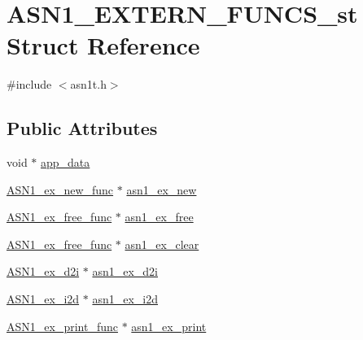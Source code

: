 \hypertarget{struct_a_s_n1___e_x_t_e_r_n___f_u_n_c_s__st}{}\section{A\+S\+N1\+\_\+\+E\+X\+T\+E\+R\+N\+\_\+\+F\+U\+N\+C\+S\+\_\+st Struct Reference}
\label{struct_a_s_n1___e_x_t_e_r_n___f_u_n_c_s__st}


{\ttfamily \#include $<$asn1t.\+h$>$}

\subsection*{Public Attributes}
\begin{DoxyCompactItemize}
\item 
void $\ast$ \hyperlink{struct_a_s_n1___e_x_t_e_r_n___f_u_n_c_s__st_aeab59571882fc1a035b3e68ea20eb8ab}{app\+\_\+data}
\item 
\hyperlink{asn1t_8h_a974a90edb24a690e5e664128a975412e}{A\+S\+N1\+\_\+ex\+\_\+new\+\_\+func} $\ast$ \hyperlink{struct_a_s_n1___e_x_t_e_r_n___f_u_n_c_s__st_aaba71f535decc929f44857651b39934c}{asn1\+\_\+ex\+\_\+new}
\item 
\hyperlink{asn1t_8h_a98b861bda8c86873a9d02978fcba10cf}{A\+S\+N1\+\_\+ex\+\_\+free\+\_\+func} $\ast$ \hyperlink{struct_a_s_n1___e_x_t_e_r_n___f_u_n_c_s__st_abdcdceb05e0645c60431380e0161eb51}{asn1\+\_\+ex\+\_\+free}
\item 
\hyperlink{asn1t_8h_a98b861bda8c86873a9d02978fcba10cf}{A\+S\+N1\+\_\+ex\+\_\+free\+\_\+func} $\ast$ \hyperlink{struct_a_s_n1___e_x_t_e_r_n___f_u_n_c_s__st_ad72f18057e4903c853d2a9cad4b8ea15}{asn1\+\_\+ex\+\_\+clear}
\item 
\hyperlink{asn1t_8h_a664088a4b0e2ebbfea6565bbc5418fc0}{A\+S\+N1\+\_\+ex\+\_\+d2i} $\ast$ \hyperlink{struct_a_s_n1___e_x_t_e_r_n___f_u_n_c_s__st_a21a25960f9687e7456623303538a03f5}{asn1\+\_\+ex\+\_\+d2i}
\item 
\hyperlink{asn1t_8h_a21b1e839f19dc49f6d7dc03bd9234cc6}{A\+S\+N1\+\_\+ex\+\_\+i2d} $\ast$ \hyperlink{struct_a_s_n1___e_x_t_e_r_n___f_u_n_c_s__st_a62c0513bce357e37e73318f641f6b74c}{asn1\+\_\+ex\+\_\+i2d}
\item 
\hyperlink{asn1t_8h_aeecb5cffbc57ff964405d46408ae0e45}{A\+S\+N1\+\_\+ex\+\_\+print\+\_\+func} $\ast$ \hyperlink{struct_a_s_n1___e_x_t_e_r_n___f_u_n_c_s__st_a9609c50686e5385236dd12796813ec0e}{asn1\+\_\+ex\+\_\+print}
\end{DoxyCompactItemize}


